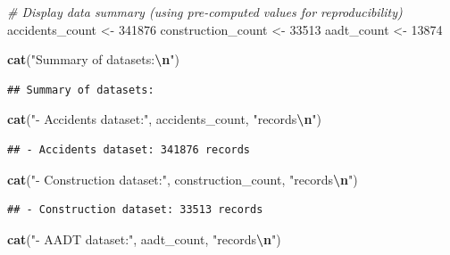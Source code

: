 \documentclass[
]{article}
\newenvironment{Shaded}{\begin{snugshade}}{\end{snugshade}}
\newcommand{\CommentTok}[1]{\textcolor[rgb]{0.56,0.35,0.01}{\textit{#1}}}
\newcommand{\DecValTok}[1]{\textcolor[rgb]{0.00,0.00,0.81}{#1}}
\newcommand{\FunctionTok}[1]{\textcolor[rgb]{0.13,0.29,0.53}{\textbf{#1}}}
\newcommand{\NormalTok}[1]{#1}
\newcommand{\OtherTok}[1]{\textcolor[rgb]{0.56,0.35,0.01}{#1}}
\newcommand{\SpecialCharTok}[1]{\textcolor[rgb]{0.81,0.36,0.00}{\textbf{#1}}}
\newcommand{\StringTok}[1]{\textcolor[rgb]{0.31,0.60,0.02}{#1}}
\begin{document}
\begin{Shaded}
\begin{Highlighting}[]
\CommentTok{\# Display data summary (using pre{-}computed values for reproducibility)}
\NormalTok{accidents\_count }\OtherTok{\textless{}{-}} \DecValTok{341876}
\NormalTok{construction\_count }\OtherTok{\textless{}{-}} \DecValTok{33513}
\NormalTok{aadt\_count }\OtherTok{\textless{}{-}} \DecValTok{13874}

\FunctionTok{cat}\NormalTok{(}\StringTok{"Summary of datasets:}\SpecialCharTok{\textbackslash{}n}\StringTok{"}\NormalTok{)}
\end{Highlighting}
\end{Shaded}

\begin{verbatim}
## Summary of datasets:
\end{verbatim}

\begin{Shaded}
\begin{Highlighting}[]
\FunctionTok{cat}\NormalTok{(}\StringTok{"{-} Accidents dataset:"}\NormalTok{, accidents\_count, }\StringTok{"records}\SpecialCharTok{\textbackslash{}n}\StringTok{"}\NormalTok{)}
\end{Highlighting}
\end{Shaded}

\begin{verbatim}
## - Accidents dataset: 341876 records
\end{verbatim}

\begin{Shaded}
\begin{Highlighting}[]
\FunctionTok{cat}\NormalTok{(}\StringTok{"{-} Construction dataset:"}\NormalTok{, construction\_count, }\StringTok{"records}\SpecialCharTok{\textbackslash{}n}\StringTok{"}\NormalTok{)}
\end{Highlighting}
\end{Shaded}

\begin{verbatim}
## - Construction dataset: 33513 records
\end{verbatim}

\begin{Shaded}
\begin{Highlighting}[]
\FunctionTok{cat}\NormalTok{(}\StringTok{"{-} AADT dataset:"}\NormalTok{, aadt\_count, }\StringTok{"records}\SpecialCharTok{\textbackslash{}n}\StringTok{"}\NormalTok{)}
\end{Highlighting}
\end{Shaded}
\end{document}
